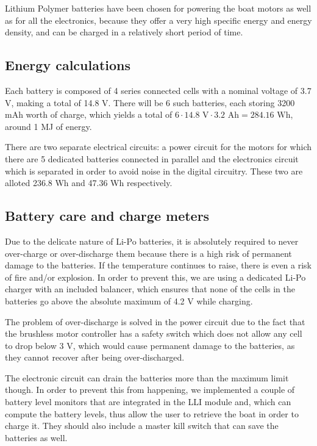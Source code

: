 	Lithium Polymer batteries have been chosen for powering the boat motors as well as for all the electronics, because they offer a very high specific energy and energy density, and can be charged in a relatively short period of time. 

\subsection{Energy calculations}
	
	Each battery is composed of 4 series connected cells with a nominal voltage of 3.7 V, making a total of 14.8 V. There will be 6 such batteries, each storing 3200 mAh worth of charge, which yields a total of $ 6 \cdot 14.8 \text{ V} \cdot 3.2\text{ Ah} = 284.16 \text{ Wh} $, around 1 MJ of energy.
	
	There are two separate electrical circuits: a power circuit for the motors for which there are 5 dedicated batteries connected in parallel and the electronics circuit which is separated in order to avoid noise in the digital circuitry. These two are alloted 236.8 Wh and 47.36 Wh respectively.
	
	\subsection{Battery care and charge meters}
	
	Due to the delicate nature of Li-Po batteries, it is absolutely required to never over-charge or over-discharge them because there is a high risk of permanent damage to the batteries. If the temperature continues to raise, there is even a risk of fire and/or explosion. In order to prevent this, we are using a dedicated Li-Po charger with an included balancer, which ensures that none of the cells in the batteries go above the absolute maximum of 4.2 V while charging.
	
	The problem of over-discharge is solved in the power circuit due to the fact that the brushless motor controller has a safety switch which does not allow any cell to drop below 3 V, which would cause permanent damage to the batteries, as they cannot recover after being over-discharged. 
	
	The electronic circuit can drain the batteries more than the maximum limit though. In order to prevent this from happening, we implemented a couple of battery level monitors that are integrated in the \ac{LLI} module and, which can compute the battery levels, thus allow the user to retrieve the boat in order to charge it. They should also include a master kill switch that can save the batteries as well.

